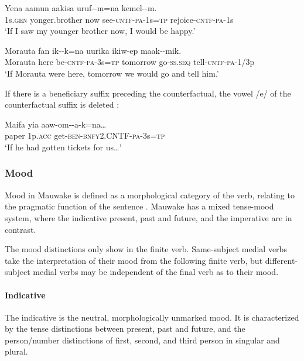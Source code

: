 \ea%
\label{ex:3:x433}
\gll Yena aamun aakisa uruf--m=na kemel--m. \\
1s.\textsc{gen} yonger.brother now see-\textsc{cntf}-\textsc{pa}-1s=\textsc{tp} rejoice-\textsc{cntf}-\textsc{pa}-1s\\
\glt`If I saw my younger brother now, I would be happy.'
\z

\ea%
\label{ex:3:x434}
\gll Morauta fan ik--k=na uurika ikiw-ep maak--mik.\\
Morauta here be-\textsc{cntf}-\textsc{pa}-3s=\textsc{tp} tomorrow go-\textsc{ss}.\textsc{seq} tell-\textsc{cntf}-\textsc{pa}-1/3p\\
\glt`If Morauta were here, tomorrow we would go and tell him.'
\z

If there is a beneficiary suffix  preceding the counterfactual, the vowel /e/ of the counterfactual suffix is deleted :

\ea%
\label{ex:3:x235}
\gll Maifa yia aaw-om--a-k=na{\dots} \\
paper 1p.\textsc{acc} get-\textsc{ben}-\textsc{bnfy}2.CNTF-\textsc{pa}-3s=\textsc{tp} \\
\glt`If he had gotten tickets for us{\dots}'
\z

\subsubsection{Mood}\label{sec:3:z:y:x}
{}
Mood in Mauwake is defined as a morphological category of the verb, relating to the pragmatic function of the sentence \citep[cf.][21]{Palmer1986}. Mauwake has a mixed tense-mood system, where the indicative present, past and future, and the imperative are in contrast. 

The mood distinctions only show in the finite verb. Same-subject medial verbs take the interpretation of their mood from the following finite verb, but different-subject medial verbs may be independent of the final verb as to their mood.

\paragraph{Indicative}\label{sec:3:a:z:y:x}
{}
The indicative is the neutral, morphologically unmarked mood. It is characterized by the tense distinctions between present, past and future, and the person/number distinctions of first, second, and third person in singular and plural. 

